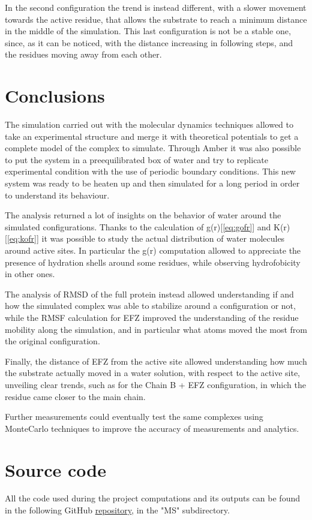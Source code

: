 \documentclass[12pt]{article}
\begin{document}
In the second configuration the trend is instead different, with a slower movement towards the active residue, that allows the substrate to reach a minimum distance in the middle of the simulation. This last configuration is not be a stable one, since, as it can be noticed, with the distance increasing in following steps, and the residues moving away from each other.

\section{Conclusions}
The simulation carried out with the molecular dynamics techniques allowed to take an  experimental structure and merge it with theoretical potentials to get a complete model of the complex to simulate. Through Amber\cite{Amber} it was also possible to put the system in a preequilibrated box of water and try to replicate experimental condition with the use of periodic boundary conditions. This new system was ready to be heaten up and then simulated for a long period in order to understand its behaviour.

The analysis returned a lot of insights on the behavior of water around the simulated configurations. Thanks to the calculation of g(r)[\ref{eq:gofr}] and K(r)[\ref{eq:kofr}] it was possible to study the actual distribution of water molecules around active sites. In particular the g(r) computation allowed to appreciate the presence of hydration shells around some residues, while observing hydrofobicity in other ones. 

The analysis of RMSD of the full protein instead allowed understanding if and how the simulated complex was able to stabilize around a configuration or not, while the RMSF calculation for EFZ improved the understanding of the residue mobility along the simulation, and in particular what atoms moved the most from the original configuration.

Finally, the distance of EFZ from the active site allowed understanding how much the substrate actually moved in a water solution, with respect to the active site, unveiling clear trends, such as for the Chain B + EFZ configuration, in which the residue came closer to the main chain. 

Further measurements could eventually test the same complexes using MonteCarlo techniques to improve the accuracy of measurements and analytics.
\section{Source code}
All the code used during the project computations and its outputs can be found in the following GitHub \href{https://github.com/Confizolo/PoDProjects}{repository}, in the "MS" subdirectory.
\pagebreak
\end{document}
